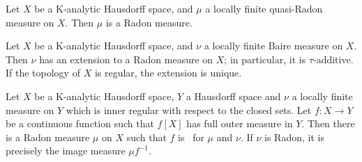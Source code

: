  Let $X$ be a K-analytic Hausdorff space, and 
$\mu$ a locally finite quasi-Radon measure on $X$.   Then $\mu$ is a 
Radon measure. 
      
      
 Let $X$ be a K-analytic Hausdorff space, 
and $\nu$ a locally finite Baire measure on $X$.   Then $\nu$ has an 
extension to a Radon measure on $X$;  in particular, it is 
$\tau$-additive.   If the topology of $X$ is 
regular, the extension is unique. 
      
      
 Let $X$ be a K-analytic Hausdorff space, $Y$ a 
Hausdorff space and $\nu$ a locally finite measure on $Y$ which is inner 
regular with respect to the closed sets.   Let $f:X\to Y$ be a 
continuous function such that $f[X]$ has full outer measure in $Y$. 
Then there is a Radon 
measure $\mu$ on $X$ such that $f$ is \imp\ for $\mu$ and $\nu$.   If 
$\nu$ is Radon, it is precisely the image measure $\mu f^{-1}$. 
      
